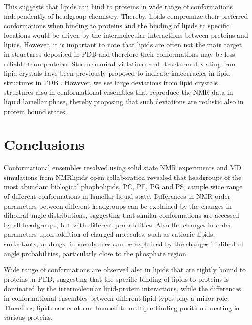 \documentclass[aps,prl,superscriptaddress,twocolumn]{revtex4}
\begin{document}
This suggests that lipids can bind to proteins in wide range of conformations independently
of headgroup chemistry. Thereby, lipids compromize their preferred conformations when binding
to proteins and the binding of lipids to specific locations would be driven by 
the intermolecular interactions between proteins and lipids.
However, it is important to note that lipids are often not the main target in
structures deposited in PDB and therefore their conformations may be less reliable than proteins.
Stereochemical violations and structures deviating from lipid crystals have been
previously proposed to indicate inaccuracies in lipid structures in PDB \cite{marsh13b,pezeshkian18}. 
However, we see large deviations from lipid crystals structures also in conformational ensembles
that reproduce the NMR data in liquid lamellar phase, thereby proposing that such deviations
are realistic also in protein bound states.

\section{Conclusions}

Conformational ensembles resolved using solid state NMR experiments and MD simulations
from NMRlipids open collaboration revealed that headgroups of the most abundant biological
phopholipids, PC, PE, PG and PS, sample wide range of different conformations in lamellar liquid state.
Differences in NMR order parameters between different headgroups can be explained
by the changes in dihedral angle distributions, suggesting that
similar conformations are accessed by all headgroups, but with different probabilities.
Also the changes in order parameters upon addition of charged molecules, such as cationic lipids, surfactants, or drugs,
in membranes can be explained by the changes in dihedral angle probabilities, particularly close to the phosphate region.

Wide range of conformations are observed also in lipids that are tightly bound to proteins in PDB,
suggesting that the specific binding of lipids to proteins is dominated by the intermolecular lipid-protein
interactions, while the differences in conformational ensembles between different lipid types
play a minor role. Therefore, lipids can conform themself to multiple binding positions locating
in various proteins.
\end{document}
